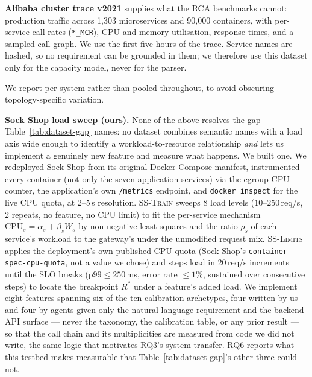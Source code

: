 \documentclass[journal, 10pt]{IEEEtran}
\begin{document}
\textbf{Alibaba cluster trace v2021} \cite{alibaba2021} supplies what the RCA
benchmarks cannot: production traffic across 1{,}303 microservices and 90{,}000
containers, with per-service call rates (\texttt{*\_MCR}), CPU and memory
utilisation, response times, and a sampled call graph. We use the first five
hours of the trace. Service names are hashed, so no requirement can be grounded
in them; we therefore use this dataset only for the capacity model, never for
the parser.

We report per-system rather than pooled throughout,
to avoid obscuring topology-specific variation.

\textbf{Sock Shop load sweep (ours).} None of the above resolves the gap Table~\ref{tab:dataset-gap}
names: no dataset combines semantic names with a load axis wide enough to identify a
workload-to-resource relationship \emph{and} lets us implement a genuinely new feature and measure
what happens. We built one. We redeployed Sock Shop from its original Docker Compose manifest,
instrumented every container (not only the seven application services) via the cgroup CPU counter,
the application's own \texttt{/metrics} endpoint, and \texttt{docker inspect} for the live CPU quota,
at $2$--$5\,$s resolution. \textsc{SS-Train} sweeps $8$ load levels ($10$--$250\,$req/s, $2$ repeats,
no feature, no CPU limit) to fit the per-service mechanism $\mathrm{CPU}_s=\alpha_s+\beta_s W_s$ by
non-negative least squares and the ratio $\rho_s$ of each service's workload to the gateway's under
the unmodified request mix. \textsc{SS-Limits} applies the deployment's own published CPU quota
(Sock Shop's \texttt{container-spec-cpu-quota}, not a value we chose) and steps load in $20\,$req/s
increments until the SLO breaks ($\mathrm{p99}\le250\,$ms, error rate $\le1\%$, sustained over
consecutive steps) to locate the breakpoint $R^{*}$ under a feature's added load. We implement eight
features spanning six of the ten calibration archetypes, four written by us and four by agents given
only the natural-language requirement and the backend API surface --- never the taxonomy, the
calibration table, or any prior result --- so that the call chain and its multiplicities are measured
from code we did not write, the same logic that motivates RQ3's system transfer. RQ6 reports what this
testbed makes measurable that Table~\ref{tab:dataset-gap}'s other three could not.
\end{document}
